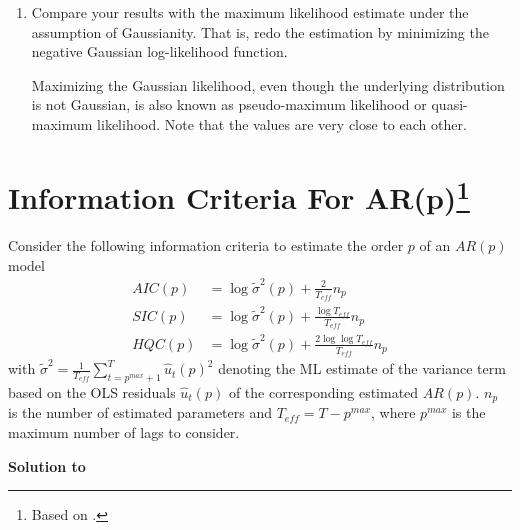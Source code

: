\documentclass[a4paper]{scrartcl}
\begin{document}
\begin{enumerate}
        \item Compare your results with the maximum likelihood estimate under the assumption of Gaussianity. That is, redo the estimation by minimizing the negative Gaussian log-likelihood function.
              \begin{solution}
                  Maximizing the Gaussian likelihood, even though the underlying distribution is not Gaussian, is also known as pseudo-maximum likelihood or quasi-maximum likelihood. Note that the values are very close to each other.
                  \newpage %
              \end{solution}
              
    \end{enumerate}
    \newpage
    
    
    \section[Information Criteria For AR(p)]{Information Criteria For AR(p)\footnote{Based on \citet{Luetkepohl.2004}.}}\label{ex:InfoCriteriaARp}
    Consider the following information criteria to estimate the order $p$ of an $AR(p)$ model 
    \begin{align*}
        AIC(p) & = \log\tilde{\sigma}^2(p) + \frac{2}{T_{eff}}n_p                  \\
        SIC(p) & = \log\tilde{\sigma}^2(p) + \frac{\log T_{eff}}{T_{eff}}n_p       \\
        HQC(p) & = \log\tilde{\sigma}^2(p) + \frac{2\log \log T_{eff}}{T_{eff}}n_p
    \end{align*}
    with $\tilde{\sigma}^2=\frac{1}{T_{eff}}\sum_{t={p^{max}+1}}^{T} \hat{u}_t(p)^2$ denoting the ML estimate of the variance term based on the OLS residuals $\hat{u}_t(p)$ of the corresponding estimated $AR(p)$. $n_p$ is the number of estimated parameters and $T_{eff}=T-p^{max}$, where $p^{max}$ is the maximum number of lags to consider.
    \begin{solution}\textbf{Solution to }\end{solution}
\end{document}
